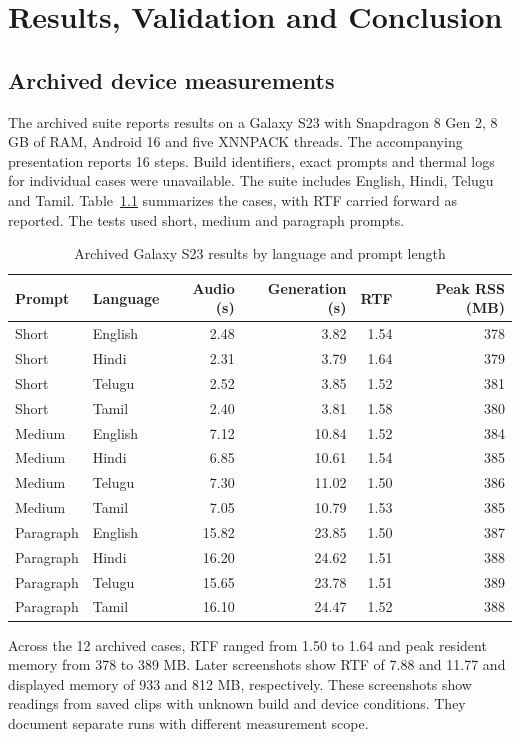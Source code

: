 \chapter{Results, Validation and Conclusion}

\section{Archived device measurements}

The archived suite reports results on a Galaxy S23 with Snapdragon 8 Gen 2,
8 GB of RAM, Android 16 and five XNNPACK threads. The accompanying
presentation reports 16 steps. Build identifiers, exact prompts and
thermal logs for individual cases were unavailable. The suite includes
English, Hindi, Telugu and Tamil. Table~\ref{tab:measurements} summarizes the
cases, with RTF carried forward as reported. The tests used short, medium and paragraph prompts.

\begin{table}[htbp]
\centering
\caption{Archived Galaxy S23 results by language and prompt length}
\label{tab:measurements}
\small
\begin{tabular}{@{}llrrrr@{}}
\toprule
Prompt & Language & Audio (s) & Generation (s) & RTF & Peak RSS (MB) \\
\midrule
Short & English & 2.48 & 3.82 & 1.54 & 378 \\
Short & Hindi & 2.31 & 3.79 & 1.64 & 379 \\
Short & Telugu & 2.52 & 3.85 & 1.52 & 381 \\
Short & Tamil & 2.40 & 3.81 & 1.58 & 380 \\
\addlinespace
Medium & English & 7.12 & 10.84 & 1.52 & 384 \\
Medium & Hindi & 6.85 & 10.61 & 1.54 & 385 \\
Medium & Telugu & 7.30 & 11.02 & 1.50 & 386 \\
Medium & Tamil & 7.05 & 10.79 & 1.53 & 385 \\
\addlinespace
Paragraph & English & 15.82 & 23.85 & 1.50 & 387 \\
Paragraph & Hindi & 16.20 & 24.62 & 1.51 & 388 \\
Paragraph & Telugu & 15.65 & 23.78 & 1.51 & 389 \\
Paragraph & Tamil & 16.10 & 24.47 & 1.52 & 388 \\
\bottomrule
\end{tabular}
\end{table}

Across the 12 archived cases, RTF ranged from 1.50 to 1.64 and peak
resident memory from 378 to 389 MB. Later screenshots show RTF of 7.88
and 11.77 and displayed memory of 933 and 812 MB, respectively. These
screenshots show readings from saved clips with unknown build and device
conditions. They document separate runs with different measurement scope.

